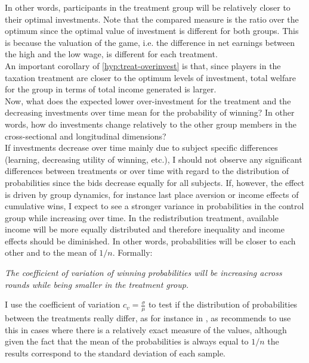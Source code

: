     In other words, participants in the treatment group will be relatively closer to their optimal investments. Note that the compared measure is the ratio over the optimum since the optimal value of investment is different for both groups. This is because the valuation of the game, i.e. the difference in net earnings between the high and the low wage, is different for each treatment.\\ 
      
    An important corollary of \cref{hyp:treat-overinvest} is that, since players in the taxation treatment are closer to the optimum levels of investment, total welfare for the group in terms of total income generated is larger.\\
    
    Now, what does the expected lower over-investment for the treatment and the decreasing investments over time mean for the probability of winning? In other words, how do investments change relatively to the other group members in the cross-sectional and longitudinal dimensions?\\
    
    If investments decrease over time mainly due to subject specific differences (learning, decreasing utility of winning, etc.), I should not observe any significant differences between treatments or over time with regard to the distribution of probabilities since the bids decrease equally for all subjects. If, however, the effect is driven by group dynamics, for instance last place aversion or income effects of cumulative wins, I expect to see a stronger variance in probabilities in the control group while increasing over time. In the redistribution treatment, available income will be more equally distributed and therefore inequality and income effects should be diminished. In other words, probabilities will be closer to each other and to the mean of $1/n$. Formally:
    
    \begin{hyp}\label{hyp:wins}
    \textit{The coefficient of variation of winning probabilities will be increasing across rounds while being smaller in the treatment group.}
    \end{hyp}
    
I use the coefficient of variation $c_v=\frac{\sigma}{\mu}$ to test if the distribution of probabilities between the treatments really differ, as for instance in \cite{rassenti2000}, as \cite{bendel1989} recommends to use this in cases where there is a relatively exact measure of the values, although given the fact that the mean of the probabilities is always equal to $1/n$ the results correspond to the standard deviation of each sample.
 
